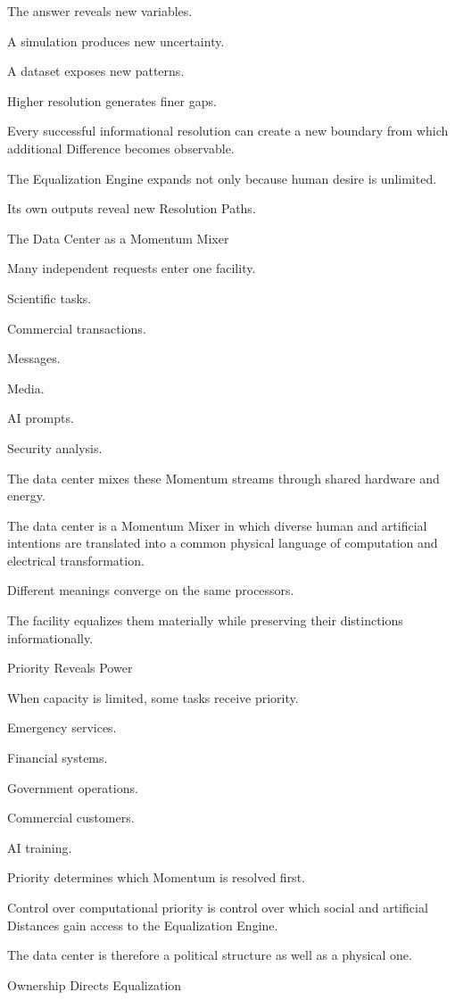 The answer reveals new variables.

A simulation produces new uncertainty.

A dataset exposes new patterns.

Higher resolution generates finer gaps.

Every successful informational resolution can create a new boundary from which additional Difference becomes observable.

The Equalization Engine expands not only because human desire is unlimited.

Its own outputs reveal new Resolution Paths.

The Data Center as a Momentum Mixer

Many independent requests enter one facility.

Scientific tasks.

Commercial transactions.

Messages.

Media.

AI prompts.

Security analysis.

The data center mixes these Momentum streams through shared hardware and energy.

The data center is a Momentum Mixer in which diverse human and artificial intentions are translated into a common physical language of computation and electrical transformation.

Different meanings converge on the same processors.

The facility equalizes them materially while preserving their distinctions informationally.

Priority Reveals Power

When capacity is limited, some tasks receive priority.

Emergency services.

Financial systems.

Government operations.

Commercial customers.

AI training.

Priority determines which Momentum is resolved first.

Control over computational priority is control over which social and artificial Distances gain access to the Equalization Engine.

The data center is therefore a political structure as well as a physical one.

Ownership Directs Equalization

